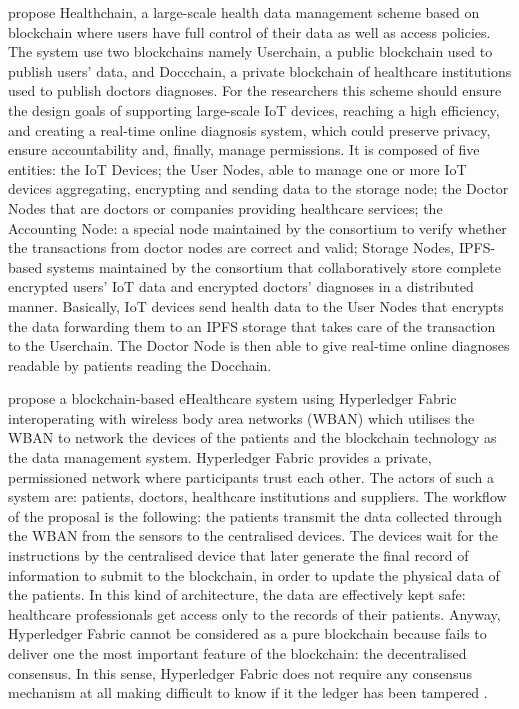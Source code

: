 \documentclass[preprint]{elsarticle}
\begin{document}
\citet{xu2019healthchain} propose Healthchain, a large-scale health data management scheme based on blockchain where users have full control of their data as well as access policies. The system use two blockchains namely Userchain, a public blockchain used to publish users' data, and Doccchain, a private blockchain of healthcare institutions used to publish doctors diagnoses. For the researchers this scheme should ensure the design goals of supporting large-scale IoT devices, reaching a high efficiency, and creating a real-time online diagnosis system, which could preserve privacy, ensure accountability and, finally, manage permissions. 
It is composed of five entities: the IoT Devices; the User Nodes, able to manage one or more IoT devices aggregating, encrypting and sending data to the storage node; the Doctor Nodes that are doctors or companies providing healthcare services; the Accounting Node: a special node maintained by the consortium to verify whether the transactions from doctor nodes are correct and valid; Storage Nodes, IPFS-based systems maintained by the consortium that collaboratively store complete encrypted users' IoT data and encrypted doctors' diagnoses in a distributed manner. 
Basically, IoT devices send health data to the User Nodes that encrypts the data forwarding them to an IPFS storage that takes care of the transaction to the Userchain. The Doctor Node is then able to give real-time online diagnoses readable by patients reading the Docchain.
	
\citet{wang2019blockchain} propose a blockchain-based eHealthcare system using Hyperledger Fabric interoperating with wireless body area networks (WBAN) which utilises the WBAN to network the devices of the patients and the blockchain technology as the data management system. Hyperledger Fabric provides a private, permissioned network where participants trust each other. The actors of such a system are: patients, doctors, healthcare institutions and suppliers. 
The workflow of the proposal is the following: the patients transmit the data collected through the WBAN from the sensors to the centralised devices. The devices wait for the instructions by the centralised device that later generate the final record of information to submit to the blockchain, in order to update the physical data of the patients. 
In this kind of architecture, the data are effectively kept safe: healthcare professionals get access only to the records of their patients. Anyway, Hyperledger Fabric cannot be considered as a pure blockchain because fails to deliver one the most important feature of the blockchain: the decentralised consensus. In this sense, Hyperledger Fabric does not require any consensus mechanism at all making difficult to know if it the ledger has been tampered \cite{cointelegraph2019ibm}.
\end{document}
